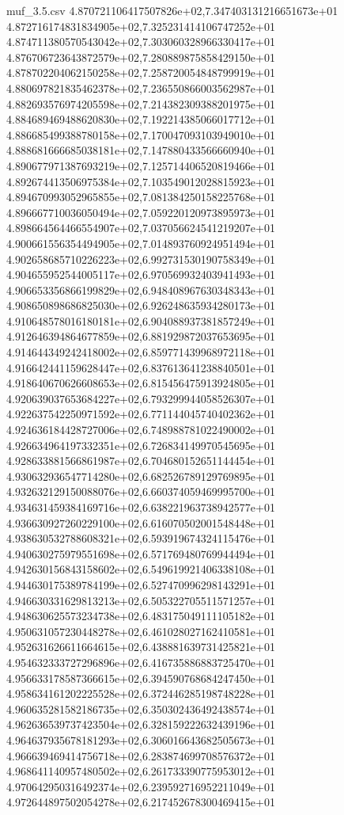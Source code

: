 \begin{filecontents*}{muf_3.5.csv}
4.870721106417507826e+02,7.347403131216651673e+01
4.872716174831834905e+02,7.325231414106747252e+01
4.874711380570543042e+02,7.303060328966330417e+01
4.876706723643872579e+02,7.280889875858429150e+01
4.878702204062150258e+02,7.258720054848799919e+01
4.880697821835462378e+02,7.236550866003562987e+01
4.882693576974205598e+02,7.214382309388201975e+01
4.884689469488620830e+02,7.192214385066017712e+01
4.886685499388780158e+02,7.170047093103949010e+01
4.888681666685038181e+02,7.147880433566660940e+01
4.890677971387693219e+02,7.125714406520819466e+01
4.892674413506975384e+02,7.103549012028815923e+01
4.894670993052965855e+02,7.081384250158225768e+01
4.896667710036050494e+02,7.059220120973895973e+01
4.898664564466554907e+02,7.037056624541219207e+01
4.900661556354494905e+02,7.014893760924951494e+01
4.902658685710226223e+02,6.992731530190758349e+01
4.904655952544005117e+02,6.970569932403941493e+01
4.906653356866199829e+02,6.948408967630348343e+01
4.908650898686825030e+02,6.926248635934280173e+01
4.910648578016180181e+02,6.904088937381857249e+01
4.912646394864677859e+02,6.881929872037653695e+01
4.914644349242418002e+02,6.859771439968972118e+01
4.916642441159628447e+02,6.837613641238840501e+01
4.918640670626608653e+02,6.815456475913924805e+01
4.920639037653684227e+02,6.793299944058526307e+01
4.922637542250971592e+02,6.771144045740402362e+01
4.924636184428727006e+02,6.748988781022490002e+01
4.926634964197332351e+02,6.726834149970545695e+01
4.928633881566861987e+02,6.704680152651144454e+01
4.930632936547714280e+02,6.682526789129769895e+01
4.932632129150088076e+02,6.660374059469995700e+01
4.934631459384169716e+02,6.638221963738942577e+01
4.936630927260229100e+02,6.616070502001548448e+01
4.938630532788608321e+02,6.593919674324115476e+01
4.940630275979551698e+02,6.571769480769944494e+01
4.942630156843158602e+02,6.549619921406338108e+01
4.944630175389784199e+02,6.527470996298143291e+01
4.946630331629813213e+02,6.505322705511571257e+01
4.948630625573234738e+02,6.483175049111105182e+01
4.950631057230448278e+02,6.461028027162410581e+01
4.952631626611664615e+02,6.438881639731425821e+01
4.954632333727296896e+02,6.416735886883725470e+01
4.956633178587366615e+02,6.394590768684247450e+01
4.958634161202225528e+02,6.372446285198748228e+01
4.960635281582186735e+02,6.350302436492438574e+01
4.962636539737423504e+02,6.328159222632439196e+01
4.964637935678181293e+02,6.306016643682505673e+01
4.966639469414756718e+02,6.283874699708576372e+01
4.968641140957480502e+02,6.261733390775953012e+01
4.970642950316492374e+02,6.239592716952211049e+01
4.972644897502054278e+02,6.217452678300469415e+01

\end{filecontents*}

